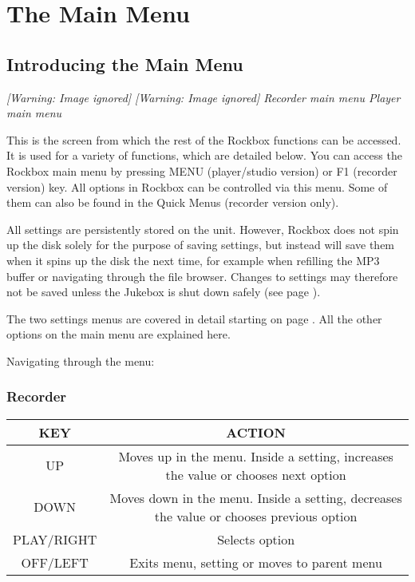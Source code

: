 \chapter{The Main Menu}
\newpage

\section{Introducing the Main Menu}
{\centering\itshape
  [Warning: Image ignored] %
 \textmd{  }  [Warning: Image ignored]
 \newline
Recorder main menu  Player main menu  
\par}

This is the screen from which the rest of the
Rockbox functions can be accessed.  It is used for a variety of
functions, which are detailed below. You can access the Rockbox main
menu by pressing MENU (player/studio version) or F1 (recorder version)
key. All options in Rockbox can be controlled via this menu. Some of
them can also be found in the Quick Menus (recorder version only).

All settings are persistently stored on the unit. However, Rockbox does
not spin up the disk solely for the purpose of saving settings, but
instead will save them when it spins up the disk the next time, for
example when refilling the MP3 buffer or navigating through the file
browser. Changes to settings may therefore not be saved unless the
Jukebox is shut down safely (see page \pageref{ref:Safeshutdown}).

The two settings menus are covered in detail starting on page \pageref{ref:Part4}.
 All the other options on the main menu are explained here.

Navigating through the menu:

\subsection{Recorder}

\begin{table}[h!]
    \begin{center}
      \begin{tabular}{|c|c|}\hline
        KEY & ACTION \\\hline
        UP & Moves up in the menu. Inside a setting, increases the value or chooses next option \\\hline
        DOWN & Moves down in the menu. Inside a setting, decreases the value or chooses previous option \\\hline
        PLAY/RIGHT & Selects option \\\hline
        OFF/LEFT & Exits menu, setting or moves to parent menu\\\hline
      \end{tabular}
    \end{center}
\end{table}

